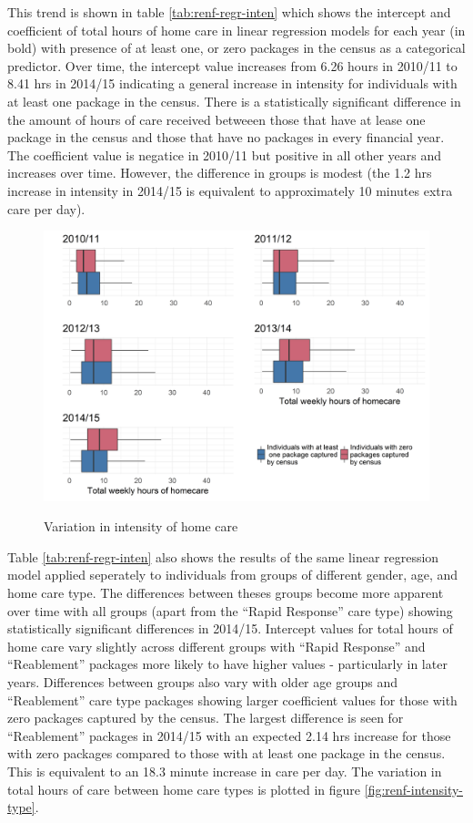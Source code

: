 \documentclass[]{article}
\begin{document}
This trend is shown in table \ref{tab:renf-regr-inten} which shows the
intercept and coefficient of total hours of home care in linear
regression models for each year (in bold) with presence of at least one,
or zero packages in the census as a categorical predictor. Over time,
the intercept value increases from 6.26 hours in 2010/11 to 8.41 hrs in
2014/15 indicating a general increase in intensity for individuals with
at least one package in the census. There is a statistically significant
difference in the amount of hours of care received betweeen those that
have at lease one package in the census and those that have no packages
in every financial year. The coefficient value is negatice in 2010/11
but positive in all other years and increases over time. However, the
difference in groups is modest (the 1.2 hrs increase in intensity in
2014/15 is equivalent to approximately 10 minutes extra care per day).

\begin{figure}[h]
  \centering
    \caption{Variation in intensity of home care}
    \includegraphics{figures/chapter-renf/14-inten.png}
    \label{fig:renf-inten}
\end{figure}

Table \ref{tab:renf-regr-inten} also shows the results of the same
linear regression model applied seperately to individuals from groups of
different gender, age, and home care type. The differences between
theses groups become more apparent over time with all groups (apart from
the ``Rapid Response'' care type) showing statistically significant
differences in 2014/15. Intercept values for total hours of home care
vary slightly across different groups with ``Rapid Response'' and
``Reablement'' packages more likely to have higher values - particularly
in later years. Differences between groups also vary with older age
groups and ``Reablement'' care type packages showing larger coefficient
values for those with zero packages captured by the census. The largest
difference is seen for ``Reablement'' packages in 2014/15 with an
expected 2.14 hrs increase for those with zero packages compared to
those with at least one package in the census. This is equivalent to an
18.3 minute increase in care per day. The variation in total hours of
care between home care types is plotted in figure
\ref{fig:renf-intensity-type}.
\end{document}
